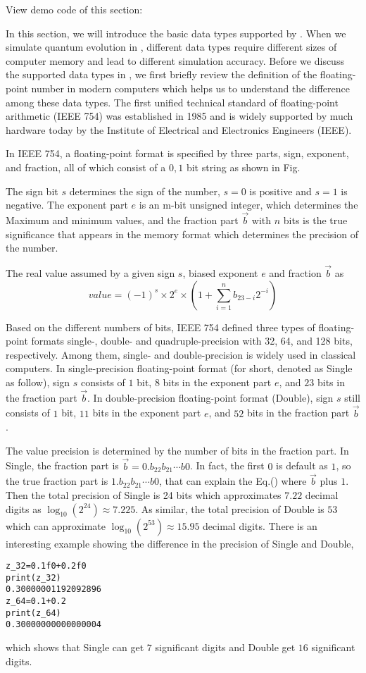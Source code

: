 View demo code of this section: 

In this section, we will introduce the basic data types supported by \MindQuantum. When we simulate quantum evolution in \MindQuantum, different data types require different sizes of computer memory and lead to different simulation accuracy.
Before we discuss the supported data types in \MindQuantum, we first briefly review the definition of the floating-point number in modern computers which helps us to understand the difference among these data types.
The first unified technical standard of floating-point arithmetic (IEEE 754) was established in 1985 and is widely supported by much hardware today by the Institute of Electrical and Electronics Engineers (IEEE).

In IEEE 754, a floating-point format is specified by three parts, sign, exponent, and fraction, all of which consist of a ${0,1}$ bit string as shown in Fig.

The sign bit $s$ determines the sign of the number, $s=0$ is positive and $s=1$ is negative.
The exponent part $e$ is an m-bit unsigned integer, which determines the Maximum and minimum values, and the fraction part $\vec{b}$ with $n$ bits is the true significance that appears in the memory format which determines the precision of the number.

The real value assumed by a given sign $s$, biased exponent $e$ and fraction $\vec{b}$ as
\begin{equation}
    value = (-1)^{s}\times 2^{e}\times (1+\sum_{i=1}^nb_{23-i}2^{-i})
\end{equation}

Based on the different numbers of bits, IEEE 754 defined three types of floating-point formats single-, double- and quadruple-precision with 32, 64, and 128 bits, respectively.
Among them, single- and double-precision is widely used in classical computers.
In single-precision floating-point format (for short, denoted as Single as follow), sign $s$ consists of $1$ bit, $8$ bits in the exponent part $e$, and $23$ bits in the fraction part $\vec{b}$.
In double-precision floating-point format (Double), sign $s$ still consists of $1$ bit, $11$ bits in the exponent part $e$, and $52$ bits in the fraction part $\vec{b}$.

The value precision is determined by the number of bits in the fraction part.
In Single, the fraction part is $\vec{b}=0.b_{22}b_{21}\cdots b{0}$.
In fact, the first $0$ is default as $1$, so the true fraction part is $1.b_{22}b_{21}\cdots b{0}$, that can explain the Eq.() where $\vec{b}$ plus $1$.
Then the total precision of Single is 24 bits which approximates $7.22$ decimal digits as $\log_{10}(2^{24}) \approx 7.225$.
As similar, the total precision of Double is $53$ which can approximate $\log_{10}(2^{53}) \approx 15.95$ decimal digits.
There is an interesting example showing the difference in the precision of Single and Double,
\begin{lstlisting}
z_32=0.1f0+0.2f0
print(z_32)
0.30000001192092896
z_64=0.1+0.2
print(z_64)
0.30000000000000004
\end{lstlisting}
which shows that Single can get $7$ significant digits and Double get $16$ significant digits.


